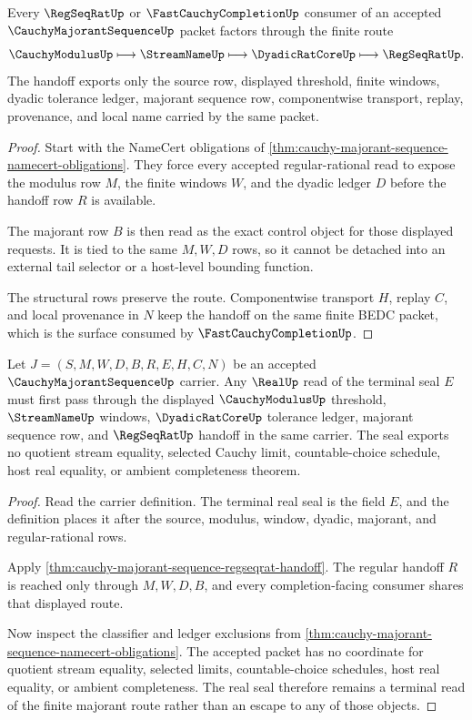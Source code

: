 \begin{theorem}
\label{thm:cauchy-majorant-sequence-regseqrat-handoff}
Every $\RegSeqRatUp$ or $\FastCauchyCompletionUp$ consumer of an accepted $\CauchyMajorantSequenceUp$ packet factors through the finite route
$$
\CauchyModulusUp
\longmapsto
\StreamNameUp
\longmapsto
\DyadicRatCoreUp
\longmapsto
\RegSeqRatUp .
$$
The handoff exports only the source row, displayed threshold, finite windows, dyadic tolerance ledger, majorant sequence row, componentwise transport, replay, provenance, and local name carried by the same packet.
\end{theorem}
\begin{proof}
Start with the NameCert obligations of \autoref{thm:cauchy-majorant-sequence-namecert-obligations}. They force every accepted regular-rational read to expose the modulus row $M$, the finite windows $W$, and the dyadic ledger $D$ before the handoff row $R$ is available.

The majorant row $B$ is then read as the exact control object for those displayed requests. It is tied to the same $M,W,D$ rows, so it cannot be detached into an external tail selector or a host-level bounding function.

The structural rows preserve the route. Componentwise transport $H$, replay $C$, and local provenance in $N$ keep the handoff on the same finite BEDC packet, which is the surface consumed by $\FastCauchyCompletionUp$.
\end{proof}

\begin{theorem}
\label{thm:cauchy-majorant-sequence-real-seal-nonescape}
Let $J=(S,M,W,D,B,R,E,H,C,N)$ be an accepted $\CauchyMajorantSequenceUp$ carrier. Any $\RealUp$ read of the terminal seal $E$ must first pass through the displayed $\CauchyModulusUp$ threshold, $\StreamNameUp$ windows, $\DyadicRatCoreUp$ tolerance ledger, majorant sequence row, and $\RegSeqRatUp$ handoff in the same carrier. The seal exports no quotient stream equality, selected Cauchy limit, countable-choice schedule, host real equality, or ambient completeness theorem.
\end{theorem}
\begin{proof}
Read the carrier definition. The terminal real seal is the field $E$, and the definition places it after the source, modulus, window, dyadic, majorant, and regular-rational rows.

Apply \autoref{thm:cauchy-majorant-sequence-regseqrat-handoff}. The regular handoff $R$ is reached only through $M,W,D,B$, and every completion-facing consumer shares that displayed route.

Now inspect the classifier and ledger exclusions from \autoref{thm:cauchy-majorant-sequence-namecert-obligations}. The accepted packet has no coordinate for quotient stream equality, selected limits, countable-choice schedules, host real equality, or ambient completeness. The real seal therefore remains a terminal read of the finite majorant route rather than an escape to any of those objects.
\end{proof}

